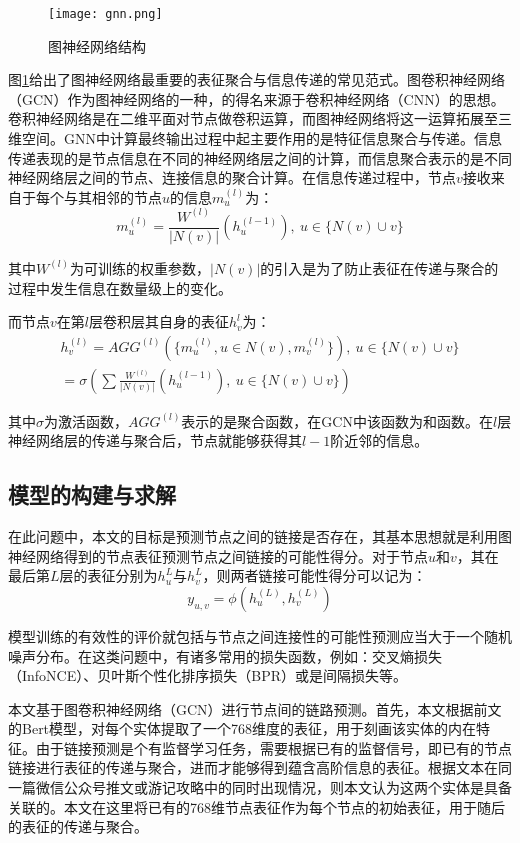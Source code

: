 \documentclass[bwprint]{gmcmthesis}
\begin{document}
\begin{figure}[!h]
\centering
\texttt{[image: gnn.png]}
\caption{图神经网络结构}
\label{gnn}
\end{figure}


图\ref{gnn}给出了图神经网络最重要的表征聚合与信息传递的常见范式。图卷积神经网络（GCN）作为图神经网络的一种，的得名来源于卷积神经网络（CNN）的思想。卷积神经网络是在二维平面对节点做卷积运算，而图神经网络将这一运算拓展至三维空间。GNN中计算最终输出过程中起主要作用的是特征信息聚合与传递。信息传递表现的是节点信息在不同的神经网络层之间的计算，而信息聚合表示的是不同神经网络层之间的节点、连接信息的聚合计算。在信息传递过程中，节点$v$接收来自于每个与其相邻的节点$u$的信息$m_{u}^{(l)}$为：
\begin{equation}
  m_{u}^{(l)} = \frac{W^{(l)}}{|N(v)|}(h_u^{(l-1)}), \ u \in \{N(v) \cup v\}
\end{equation}

其中$W^{(l)}$为可训练的权重参数，$|N(v)|$的引入是为了防止表征在传递与聚合的过程中发生信息在数量级上的变化。

而节点$v$在第$l$层卷积层其自身的表征$h_v^{l}$为：
\begin{gather}
	h_{v}^{(l)} = AGG^{(l)}(\{m_u^{(l)}, u \in N(v), m_v^{(l)}\}), \ u \in \{N(v) \cup v\} \\ 
	= \sigma(\sum \frac{W^{(l)}}{|N(v)|}(h_u^{(l-1)}), \ u \in \{N(v) \cup v\})
\end{gather}

其中$\sigma$为激活函数，$AGG^{(l)}$表示的是聚合函数，在GCN中该函数为和函数。在$l$层神经网络层的传递与聚合后，节点就能够获得其$l-1$阶近邻的信息。

\subsection{模型的构建与求解}

在此问题中，本文的目标是预测节点之间的链接是否存在，其基本思想就是利用图神经网络得到的节点表征预测节点之间链接的可能性得分。对于节点$u$和$v$，其在最后第$L$层的表征分别为$h_u^{L}$与$h_v^{L}$，则两者链接可能性得分可以记为：
\begin{equation}
	y_{u, v} = \phi(h_u^{(L)}, h_v^{(L)})
\end{equation}

模型训练的有效性的评价就包括与节点之间连接性的可能性预测应当大于一个随机噪声分布。在这类问题中，有诸多常用的损失函数，例如：交叉熵损失（InfoNCE）、贝叶斯个性化排序损失（BPR）或是间隔损失等。

本文基于图卷积神经网络（GCN）进行节点间的链路预测。首先，本文根据前文的Bert模型，对每个实体提取了一个768维度的表征，用于刻画该实体的内在特征。由于链接预测是个有监督学习任务，需要根据已有的监督信号，即已有的节点链接进行表征的传递与聚合，进而才能够得到蕴含高阶信息的表征。根据文本在同一篇微信公众号推文或游记攻略中的同时出现情况，则本文认为这两个实体是具备关联的。本文在这里将已有的768维节点表征作为每个节点的初始表征，用于随后的表征的传递与聚合。
\end{document}
